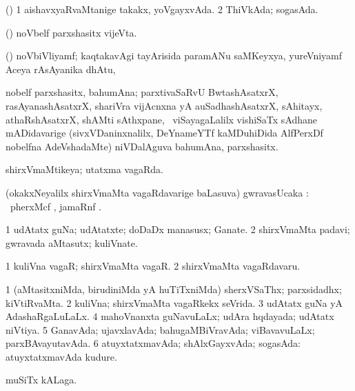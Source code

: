 \bentry
{}
\gl{\gu}
\bmng
(\ashi) 
\bnum
\num{1} aishavxyaRvaMtanige takakx, yoVgayxvAda. 
\num{2} ThiVkAda; sogasAda. 
\enum
\emng
\eentry

\bentry
{}
\gl{\nA}
\bmng
(\ame) noVbelf parxshasitx vijeVta. 
\emng
\eentry

\bentry
{}
\gl{\nA}
\bmng
(\ravi) noVbiVliyamf; kaqtakavAgi tayArisida  paramANu saMKeyxya, yureVniyamf Aceya rAsAyanika dhAtu, \saMkeV\  
\emng
\eentry

\bentry
{}
\gl{\nA}
\bmng
nobelf parxshasitx, bahumAna; parxtivaSaRvU BwtashAsatxrX, rasAyanashAsatxrX, shariVra vijAcnxna yA auSadhashAsatxrX, sAhitayx, athaRshAsatxrX, shAMti sAthxpane, \mo\ viSayagaLalilx vishiSaTx sAdhane mADidavarige (sivxVDaninxnalilx, DeYnameYTf kaMDuhiDida AlfPerxDf nobelfna AdeVshadaMte) niVDalAguva bahumAna, parxshasitx. 
\emng
\eentry

\bentry
{}
\gl{\gu}
\bmng
shirxVmaMtikeya; utatxma vagaRda. 
\emng

\noindent
\gl{\pagu}
\bmng
 (okakxNeyalilx shirxVmaMta vagaRdavarige baLasuva) gwravasUcaka \upa: \udA\ pherxMcf , jamaRnf . 
\emng
\eentry

\bentry
{}
\gl{\nA}
\bmng
\bnum
\num{1} udAtatx guNa; udAtatxte; doDaDx manasusx; Ganate. 
\num{2} shirxVmaMta padavi; gwravada aMtasutx; kuliVnate. 
\enum
\emng

\noindent
\gl{\pagu}
\bmng
\bnum
\num{1}  kuliVna vagaR; shirxVmaMta vagaR. 
\num{2}  shirxVmaMta vagaRdavaru. 
\enum
\emng
\eentry

\bentry
{}
\gl{\gu}
\bmng
\bnum
\num{1} (aMtasitxniMda, birudiniMda yA huTiTxniMda) sherxVSaThx; parxsidadhx; kiVtiRvaMta. 
\num{2} kuliVna; shirxVmaMta vagaRkekx seVrida. 
\num{3} udAtatx guNa yA AdashaRgaLuLaLx. 
\num{4} mahoVnanxta guNavuLaLx; udAra hqdayada; udAtatx niVtiya. 
\num{5} GanavAda; ujavxlavAda; bahugaMBiVravAda; viBavavuLaLx; parxBAvayutavAda. 
\num{6} atuyxtatxmavAda; shAlxGayxvAda; sogasAda:  atuyxtatxmavAda kudure. 
\enum
\emng

\noindent
\gl{\pagu}
\bmng
{} muSiTx kALaga. 
\emng
\eentry

